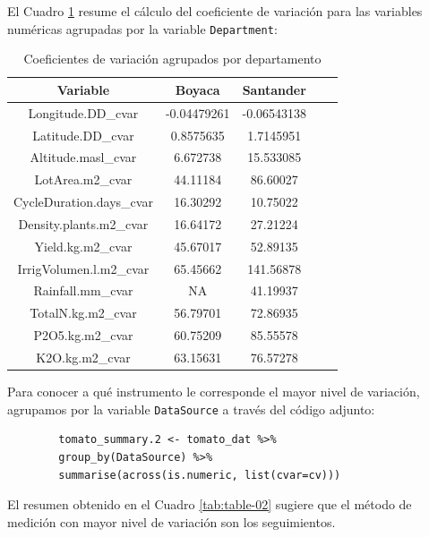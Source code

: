 \documentclass[11pt,letterpaper]{article}
\begin{document}
	El Cuadro \ref{tab:table-01} resume el cálculo del coeficiente de variación para las variables numéricas agrupadas por la variable {\tt Department}:

	\begin{table}
		\centering
		\begin{tabular}{|c|c|c|c|c|} \hline
			Variable & Boyaca & Santander\\ \hline
			Longitude.DD\_cvar & -0.04479261 & -0.06543138\\ 
			Latitude.DD\_cvar & 0.8575635 & 1.7145951\\ 
			Altitude.masl\_cvar &  6.672738 & 15.533085\\ 
			LotArea.m2\_cvar & 44.11184 & 86.60027\\ 
			CycleDuration.days\_cvar & 16.30292 & 10.75022\\ 
			Density.plants.m2\_cvar & 16.64172 & 27.21224\\ 
			Yield.kg.m2\_cvar & 45.67017 & 52.89135\\ 
			IrrigVolumen.l.m2\_cvar &  65.45662 & 141.56878\\ 
			Rainfall.mm\_cvar & NA & 41.19937\\ 
			TotalN.kg.m2\_cvar & 56.79701 & 72.86935\\ 
			P2O5.kg.m2\_cvar & 60.75209 & 85.55578\\ 
			K2O.kg.m2\_cvar & 63.15631 & 76.57278\\   \hline
		\end{tabular}
		\caption{\label{tab:table-01} Coeficientes de variación agrupados por departamento}
	\end{table}
	
	Para conocer a qué instrumento le corresponde el mayor nivel de variación, agrupamos por la variable {\tt DataSource} a través del código adjunto:
	
	\begin{verbatim}
		tomato_summary.2 <- tomato_dat %>% 
		group_by(DataSource) %>% 
		summarise(across(is.numeric, list(cvar=cv))) 
	\end{verbatim}

	El resumen obtenido en el Cuadro \ref{tab:table-02} sugiere que el método de medición con mayor nivel de variación son los seguimientos.
\end{document}
